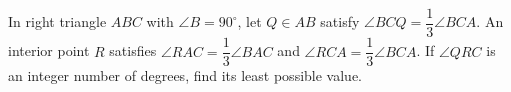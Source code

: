 In right triangle $ABC$ with $\angle B=90^\circ$, let $Q\in AB$ satisfy $\angle BCQ=\dfrac{1}{3}\angle BCA$. An interior point $R$ satisfies $\angle RAC=\dfrac{1}{3}\angle BAC$ and $\angle RCA=\dfrac{1}{3}\angle BCA$. If $\angle QRC$ is an integer number of degrees, find its least possible value.
